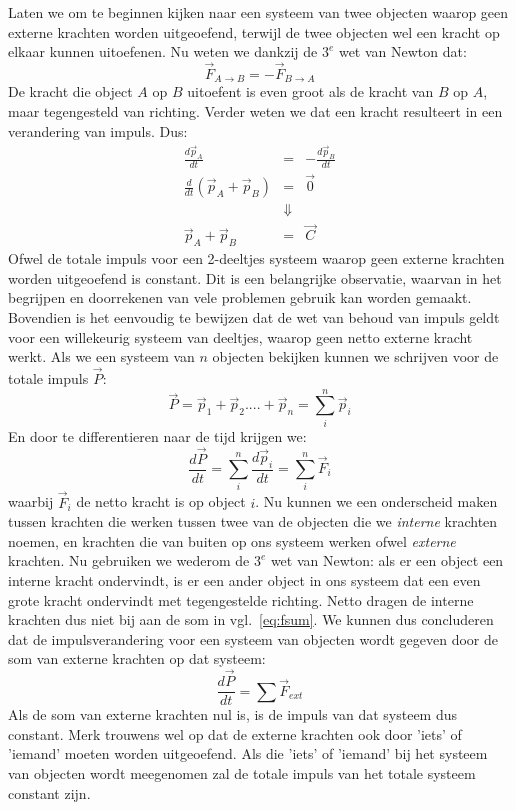 Laten we om te beginnen kijken naar een systeem van twee objecten waarop geen 
externe krachten worden uitgeoefend, terwijl de twee objecten wel een kracht op
elkaar kunnen uitoefenen. Nu weten we dankzij de $3^e$ wet van Newton dat:
\begin{equation}
\vec{F}_{A\rightarrow B}=-\vec{F}_{B\rightarrow A}
\end{equation}
De kracht die object $A$ op $B$ uitoefent is even groot als de kracht van $B$ op $A$, maar
tegengesteld van richting. Verder weten we dat een kracht resulteert in een verandering
van impuls. Dus:
\begin{eqnarray}
\frac{d\vec{p}_A}{dt} & = & -\frac{d\vec{p}_B}{dt}  \\
\frac{d}{dt}\left(\vec{p}_A+\vec{p}_B\right) & = & \vec{0} \\
&\Downarrow&\nonumber \\
\vec{p}_A+\vec{p}_B & =  & \vec{C}
\end{eqnarray}
Ofwel de totale impuls voor een 2-deeltjes systeem waarop geen externe krachten worden 
uitgeoefend is constant. Dit is een belangrijke observatie, waarvan in het begrijpen en 
doorrekenen van vele problemen gebruik kan worden gemaakt. Bovendien is het eenvoudig 
te bewijzen dat de wet van behoud van impuls geldt voor een willekeurig systeem van 
deeltjes, waarop geen netto externe kracht  werkt. Als we een systeem van $n$ objecten
bekijken kunnen we schrijven voor de totale impuls $\vec{P}$:
\begin{equation}\label{eq:ptot}
\vec{P} = \vec{p}_1 + \vec{p}_2 .... + \vec{p}_n = \sum_i^n\vec{p}_i
\end{equation}
En door te differentieren naar de tijd krijgen we:
\begin{equation}\label{eq:fsum}
\frac{d\vec{P}}{dt} = \sum_i^n\frac{d\vec{p}_i}{dt} = \sum_i^n \vec{F}_i
\end{equation}
waarbij $\vec{F}_i$ de netto kracht is op object $i$. Nu kunnen we een onderscheid 
maken tussen krachten die werken tussen twee van de objecten die we \emph{interne} krachten
noemen, en krachten die van buiten op ons systeem werken ofwel \emph{externe} krachten.
Nu gebruiken we wederom de $3^e$ wet van Newton: als er een object een interne kracht
ondervindt, is er een ander object in ons systeem dat een even grote kracht ondervindt
met tegengestelde richting. Netto dragen de interne krachten dus niet bij aan de
som in vgl.~\ref{eq:fsum}. We kunnen dus concluderen dat de impulsverandering
voor een systeem van objecten wordt gegeven door de som van externe krachten op dat systeem:
\begin{equation}\label{eq:atot}
\frac{d\vec{P}}{dt} = \sum \vec{F}_{ext}
\end{equation}
Als de som van externe krachten nul is, is de impuls van dat systeem dus constant. 
Merk trouwens wel op dat de externe krachten ook door 'iets' of 'iemand' moeten worden
uitgeoefend. Als die 'iets' of 'iemand' bij het systeem van objecten wordt meegenomen zal
de totale impuls van het totale systeem constant zijn.

